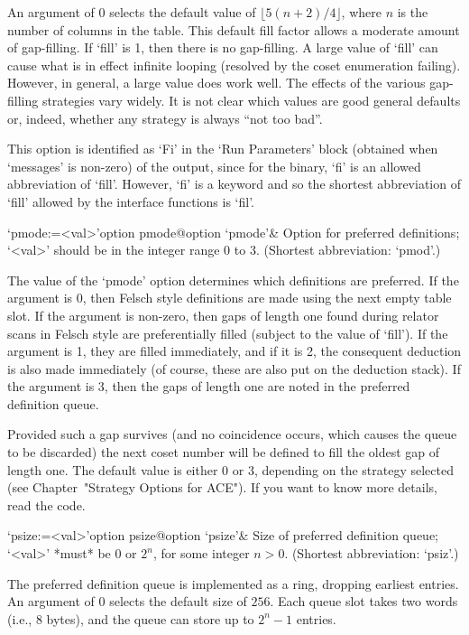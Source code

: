 An  argument of  0  selects  the default  value  of $\lfloor  5(n+2)/4
\rfloor$,  where $n$  is the  number of  columns in  the  table.  This
default  fill factor  allows  a moderate  amount  of gap-filling.   If
`fill' is  1, then there is  no gap-filling.  A large  value of `fill'
can cause  what is in effect  infinite looping (resolved  by the coset
enumeration failing).   However, in general,  a large value  does work
well.  The  effects of the various gap-filling  strategies vary widely.
It is  not clear  which values are  good general defaults  or, indeed,
whether any strategy is always ``not too bad''.

This option is identified as `Fi' in the  \lq{}Run  Parameters'  block
(obtained when `messages' is non-zero) of the {\ACE} output, since for
the {\ACE} binary, `fi' is an allowed abbreviation of `fill'. However,
`fi' is a {\GAP} keyword and so the shortest  abbreviation  of  `fill'
allowed by the interface functions is `fil'.

\>`pmode:=<val>'{option pmode}@{option `pmode'}&
Option for preferred definitions; `<val>' should  be  in  the  integer
range 0 to 3. (Shortest abbreviation: `pmod'.)

The  value of  the  `pmode' option  determines  which definitions  are
preferred.  If  the argument is  0, then Felsch style  definitions are
made using  the next empty table  slot.  If the  argument is non-zero,
then gaps of length one found during relator scans in Felsch style are
preferentially  filled  (subject to  the  value  of  `fill').  If  the
argument  is 1,  they are  filled  immediately, and  if it  is 2,  the
consequent deduction  is also made  immediately (of course,  these are
also put on the deduction stack).  If the argument is 3, then the gaps
of length one are noted in the preferred definition queue.

Provided such a gap survives (and no coincidence occurs, which  causes
the queue to be discarded) the next coset number will  be  defined  to
fill the oldest gap of length one. The default value is either 0 or 3,
depending on the strategy selected (see Chapter~"Strategy Options  for
ACE"). If you want to know more details, read the code.


\>`psize:=<val>'{option psize}@{option `psize'}&
Size of preferred definition queue; `<val>' *must* be 0 or $2^n$,  for
some integer $n>0$. (Shortest abbreviation: `psiz'.)

The  preferred definition  queue is  implemented as  a  ring, dropping
earliest entries. An argument of 0 selects  the default size of $256$.
Each  queue slot takes two words (i.e., 8 bytes),  and the  queue  can
store up to $2^n-1$ entries.

